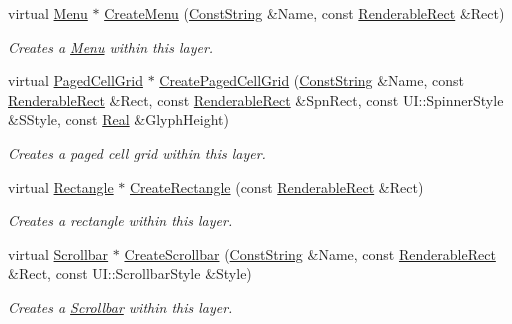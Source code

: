 \begin{DoxyCompactItemize}
virtual \hyperlink{classphys_1_1UI_1_1Menu}{Menu} $\ast$ \hyperlink{classphys_1_1UI_1_1Layer_afe5b5ed6409890ba6d9511e3246e69a9}{CreateMenu} (\hyperlink{namespacephys_a5ce5049f8b4bf88d6413c47b504ebb31}{ConstString} \&Name, const \hyperlink{structphys_1_1UI_1_1RenderableRect}{RenderableRect} \&Rect)
\begin{DoxyCompactList}\small\item\em Creates a \hyperlink{classphys_1_1UI_1_1Menu}{Menu} within this layer. \item\end{DoxyCompactList}\item 
virtual \hyperlink{classphys_1_1UI_1_1PagedCellGrid}{PagedCellGrid} $\ast$ \hyperlink{classphys_1_1UI_1_1Layer_a1c8326e5c53dc64d53288883d8a0496a}{CreatePagedCellGrid} (\hyperlink{namespacephys_a5ce5049f8b4bf88d6413c47b504ebb31}{ConstString} \&Name, const \hyperlink{structphys_1_1UI_1_1RenderableRect}{RenderableRect} \&Rect, const \hyperlink{structphys_1_1UI_1_1RenderableRect}{RenderableRect} \&SpnRect, const UI::SpinnerStyle \&SStyle, const \hyperlink{namespacephys_af7eb897198d265b8e868f45240230d5f}{Real} \&GlyphHeight)
\begin{DoxyCompactList}\small\item\em Creates a paged cell grid within this layer. \item\end{DoxyCompactList}\item 
virtual \hyperlink{classphys_1_1UI_1_1Rectangle}{Rectangle} $\ast$ \hyperlink{classphys_1_1UI_1_1Layer_aea42a78478489c92c39e5e0b1ca6d289}{CreateRectangle} (const \hyperlink{structphys_1_1UI_1_1RenderableRect}{RenderableRect} \&Rect)
\begin{DoxyCompactList}\small\item\em Creates a rectangle within this layer. \item\end{DoxyCompactList}\item 
virtual \hyperlink{classphys_1_1UI_1_1Scrollbar}{Scrollbar} $\ast$ \hyperlink{classphys_1_1UI_1_1Layer_ab7ad4b0db348beddfe63d1f9c914f1ca}{CreateScrollbar} (\hyperlink{namespacephys_a5ce5049f8b4bf88d6413c47b504ebb31}{ConstString} \&Name, const \hyperlink{structphys_1_1UI_1_1RenderableRect}{RenderableRect} \&Rect, const UI::ScrollbarStyle \&Style)
\begin{DoxyCompactList}\small\item\em Creates a \hyperlink{classphys_1_1UI_1_1Scrollbar}{Scrollbar} within this layer. \item\end{DoxyCompactList}\item 

\end{DoxyCompactItemize}
